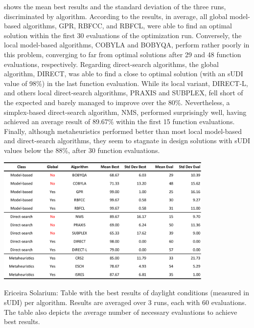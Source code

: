  shows the mean best results and the standard deviation of the three runs,  discriminated by algorithm. According to the results, in average, all global model-based algorithms, GPR, RBFCC, and RBFCL, were able to find an optimal solution within the first 30 evaluations of the optimization run. Conversely, the local model-based algorithms, COBYLA and BOBYQA, perform rather poorly in this problem, converging to far from optimal solutions after 29 and 48 function evaluations, respectively. Regarding direct-search algorithms, the global algorithm, DIRECT, was able to find a close to optimal solution (with an \ac{sUDI} value of 98\%) in the last function evaluation. While its local variant, DIRECT-L, and others local direct-search algorithms, PRAXIS and SUBPLEX, fell short of the expected and barely managed to improve over the 80\%. Nevertheless, a simplex-based direct-search algorithm, NMS, performed surprisingly well, having achieved an average result of 89.67\% within the first 15 function evaluations. Finally, although metaheuristics performed better than most local model-based and direct-search algorithms, they seem to stagnate in design solutions with sUDI values below the 88\%, after 30 function evaluations.

\begin{table}[htbp]
	\centering
	\includegraphics[width=0.8\textwidth]{tables_and_code/Ericeira_phase1_stats_v1.pdf}
	\caption[Ericeira Solarium: Table with best results and necessary evaluations per algorithm]{Ericeira Solarium: Table with the best results of daylight conditions (measured in \ac{sUDI}) per algorithm. Results are averaged over 3 runs, each with 60 evaluations. The table also depicts the average number of necessary evaluations to achieve best results.}
	\label{table:phase1results}
\end{table}

